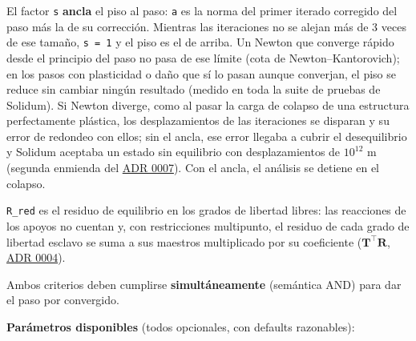 \documentclass[11pt,oneside]{report}
\begin{document}
El factor \texttt{s} \textbf{ancla} el piso al paso: \texttt{a} es la norma del primer iterado corregido del paso más la de su corrección. Mientras las iteraciones no se alejan más de 3 veces de ese tamaño, \texttt{s = 1} y el piso es el de arriba. Un Newton que converge rápido desde el principio del paso no pasa de ese límite (cota de Newton--Kantorovich); en los pasos con plasticidad o daño que sí lo pasan aunque converjan, el piso se reduce sin cambiar ningún resultado (medido en toda la suite de pruebas de Solidum). Si Newton diverge, como al pasar la carga de colapso de una estructura perfectamente plástica, los desplazamientos de las iteraciones se disparan y su error de redondeo con ellos; sin el ancla, ese error llegaba a cubrir el desequilibrio y Solidum aceptaba un estado sin equilibrio con desplazamientos de $10^{12}$ m (segunda enmienda del \href{https://github.com/jretamav/solidum-fem/blob/main/docs/adr/0007-tolerancias-convergencia-solvers.md}{ADR 0007}). Con el ancla, el análisis se detiene en el colapso.

\texttt{R\_red} es el residuo de equilibrio en los grados de libertad libres: las reacciones de los apoyos no cuentan y, con restricciones multipunto, el residuo de cada grado de libertad esclavo se suma a sus maestros multiplicado por su coeficiente ($\mathbf T^\top\mathbf R$, \href{https://github.com/jretamav/solidum-fem/blob/main/docs/adr/0004-imposicion-de-condiciones-de-dirichlet.md}{ADR 0004}).

Ambos criterios deben cumplirse \textbf{simultáneamente} (semántica AND) para dar el paso por convergido.

\textbf{Parámetros disponibles} (todos opcionales, con defaults razonables):
\end{document}
